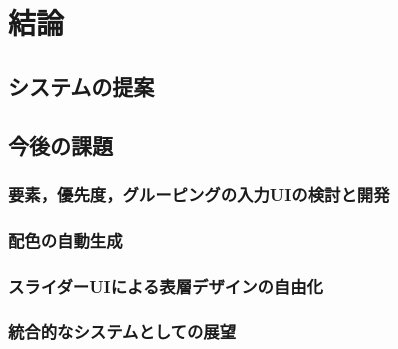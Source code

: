 \chapter{結論}
\label{chap:conclusion}

\section{システムの提案}

\section{今後の課題}
\subsection{要素，優先度，グルーピングの入力UIの検討と開発}
\subsection{配色の自動生成}
\subsection{スライダーUIによる表層デザインの自由化}
\subsection{統合的なシステムとしての展望}
